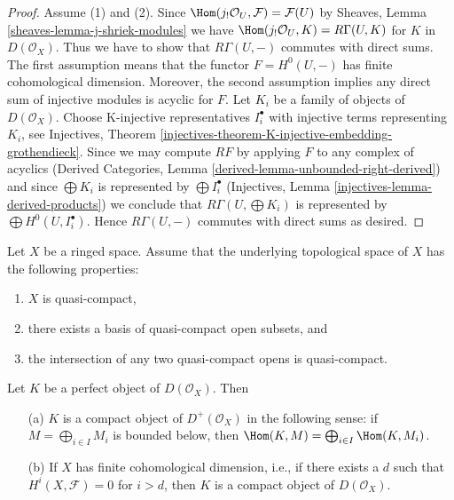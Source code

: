 \begin{proof}
Assume (1) and (2). Since
$\Hom(j_!\mathcal{O}_U, \mathcal{F}) = \mathcal{F}(U)$
by Sheaves, Lemma \ref{sheaves-lemma-j-shriek-modules}
we have $\Hom(j_!\mathcal{O}_U, K) = R\Gamma(U, K)$ for
$K$ in $D(\mathcal{O}_X)$. Thus we have to show that $R\Gamma(U, -)$
commutes with direct sums. The first assumption means that the functor
$F = H^0(U, -)$ has finite cohomological dimension. Moreover, the second
assumption implies any direct sum of injective modules is acyclic for $F$.
Let $K_i$ be a family of objects of $D(\mathcal{O}_X)$.
Choose K-injective representatives $I_i^\bullet$ with injective terms
representing $K_i$, see Injectives, Theorem
\ref{injectives-theorem-K-injective-embedding-grothendieck}.
Since we may compute $RF$ by applying $F$ to any complex of acyclics
(Derived Categories, Lemma \ref{derived-lemma-unbounded-right-derived})
and since $\bigoplus K_i$ is represented by $\bigoplus I_i^\bullet$
(Injectives, Lemma \ref{injectives-lemma-derived-products})
we conclude that $R\Gamma(U, \bigoplus K_i)$ is represented by
$\bigoplus H^0(U, I_i^\bullet)$. Hence $R\Gamma(U, -)$ commutes
with direct sums as desired.
\end{proof}

\begin{lemma}
\label{lemma-perfect-is-compact}
Let $X$ be a ringed space. Assume that the underlying topological space
of $X$ has the following properties:
\begin{enumerate}
\item $X$ is quasi-compact,
\item there exists a basis of quasi-compact open subsets, and
\item the intersection of any two quasi-compact opens is quasi-compact.
\end{enumerate}
Let $K$ be a perfect object of $D(\mathcal{O}_X)$. Then
\begin{enumerate}
\item[(a)] $K$ is a compact object of $D^+(\mathcal{O}_X)$
in the following sense: if $M = \bigoplus_{i \in I} M_i$ is
bounded below, then $\Hom(K, M) = \bigoplus_{i \in I} \Hom(K, M_i)$.
\item[(b)] If $X$ has finite cohomological dimension, i.e., if there exists
a $d$ such that $H^i(X, \mathcal{F}) = 0$ for $i > d$, then
$K$ is a compact object of $D(\mathcal{O}_X)$.
\end{enumerate}
\end{lemma}

